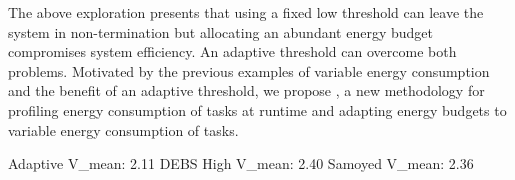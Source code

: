 The above exploration presents that using a fixed low threshold can leave the system in non-termination but allocating an abundant energy budget compromises system efficiency. 
An adaptive threshold can overcome both problems.
Motivated by the previous examples of variable energy consumption and the benefit of an adaptive threshold, we propose \nn{}, a new methodology for profiling energy consumption of tasks at runtime and adapting energy budgets to variable energy consumption of tasks. 

Adaptive V\_mean: 2.11
DEBS High V\_mean: 2.40
Samoyed V\_mean: 2.36